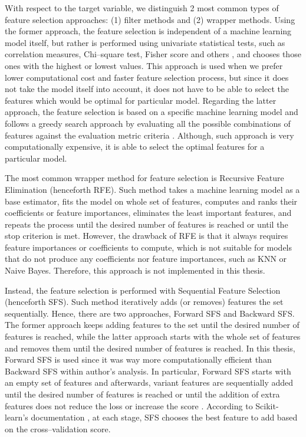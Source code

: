 With respect to the target variable, we distinguish 2 most common types of feature selection approaches: (1) filter methods and (2) wrapper methods.
Using the former approach, the feature selection is independent of a machine learning model itself, but rather is performed using univariate statistical tests, such as correlation measures, Chi--square test, Fisher score and others \citep{kaushik2016introduction}, and chooses those ones with the highest or lowest values.
This approach is used when we prefer lower computational cost and faster feature selection process, but since it does not take the model itself into account, it does not have to be able to select the features which would be optimal for particular model.
Regarding the latter approach, the feature selection is based on a specific machine learning model and follows a greedy search approach by evaluating all the possible combinations of features against the evaluation metric criteria \citep{Verma2020}. Although, such approach is very computationally expensive, it is able to select the optimal features for a particular model.

The most common wrapper method for feature selection is Recursive Feature Elimination (henceforth RFE). Such method takes a machine learning model as a base estimator, fits the model on whole set of features, computes and ranks their coefficients or feature importances, eliminates the least important features, and repeats the process until the desired number of features is reached \citep{Brownlee2020} or until the stop criterion is met.
However, the drawback of RFE is that it always requires feature importances or coefficients to compute, which is not suitable for models that do not produce any coefficients nor feature importances, such as KNN or Naive Bayes. Therefore, this approach is not implemented in this thesis.

Instead, the feature selection is performed with Sequential Feature Selection (henceforth SFS). Such method iteratively adds (or removes) features the set sequentially. Hence, there are two approaches, Forward SFS and Backward SFS.
The former approach keeps adding features to the set until the desired number of features is reached, while the latter approach starts with the whole set of features and removes them until the desired number of features is reached.
In this thesis, Forward SFS is used since it was way more computationally efficient than Backward SFS within author's analysis. In particular, Forward SFS starts with an empty set of features and afterwards, variant features are sequentially added until the desired number of features is reached  or until the addition of extra features does not reduce the loss or increase the score \citep{Verma2021}. 
According to Scikit-learn's documentation \citep{sfs}, at each stage, SFS chooses the best feature to add based on the cross--validation score.

